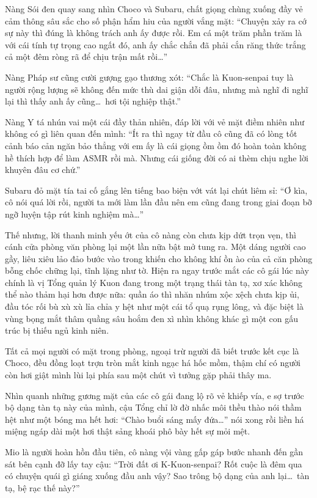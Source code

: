 \documentclass[../main.tex]{subfiles}
\begin{document}
Nàng Sói đen quay sang nhìn Choco và Subaru, chất giọng chùng xuống đầy vẻ cảm thông sâu sắc cho số phận hẩm hiu của người vắng mặt: ``Chuyện xảy ra cớ sự này thì đúng là không trách anh ấy được rồi. Em cá một trăm phần trăm là với cái tính tự trọng cao ngất đó, anh ấy chắc chắn đã phải cắn răng thức trắng cả một đêm ròng rã để chịu trận mất rồi\dots''

Nàng Pháp sư cũng cười gượng gạo thương xót: ``Chắc là Kuon-senpai tuy là người rộng lượng sẽ không đến mức thù dai giận dỗi đâu, nhưng mà nghĩ đi nghĩ lại thì thấy anh ấy cũng\dots\ hơi tội nghiệp thật.''

Nàng Y tá nhún vai một cái đầy thản nhiên, đáp lời với vẻ mặt điềm nhiên như không có gì liên quan đến mình: ``Ít ra thì ngay từ đầu cô cũng đã có lòng tốt cảnh báo cản ngăn bảo thẳng với em ấy là cái giọng ồm ồm đó hoàn toàn không hề thích hợp để làm ASMR rồi mà. Nhưng cái giống đời có ai thèm chịu nghe lời khuyên đâu cơ chứ.''

Subaru đỏ mặt tía tai cố gắng lên tiếng bao biện vớt vát lại chút liêm sỉ: ``Ơ kìa, cô nói quá lời rồi, người ta mới làm lần đầu nên em cũng đang trong giai đoạn bỡ ngỡ luyện tập rút kinh nghiệm mà\dots''

Thế nhưng, lời thanh minh yếu ớt của cô nàng còn chưa kịp dứt trọn vẹn, thì cánh cửa phòng văn phòng lại một lần nữa bật mở tung ra. Một dáng người cao gầy, liêu xiêu lảo đảo bước vào trong khiến cho không khí ồn ào của cả căn phòng bỗng chốc chững lại, tĩnh lặng như tờ. Hiện ra ngay trước mắt các cô gái lúc này chính là vị Tổng quản lý Kuon đang trong một trạng thái tàn tạ, xơ xác không thể nào thảm hại hơn được nữa: quần áo thì nhăn nhúm xộc xệch chưa kịp ủi, đầu tóc rối bù xù xù lỉa chỉa y hệt như một cái tổ quạ rụng lông, và đặc biệt là vùng bọng mắt thâm quầng sâu hoắm đen xì nhìn không khác gì một con gấu trúc bị thiếu ngủ kinh niên.

Tất cả mọi người có mặt trong phòng, ngoại trừ người đã biết trước kết cục là Choco, đều đồng loạt trợn tròn mắt kinh ngạc há hốc mồm, thậm chí có người còn hơi giật mình lùi lại phía sau một chút vì tưởng gặp phải thây ma.

Nhìn quanh những gương mặt của các cô gái đang lộ rõ vẻ khiếp vía, e sợ trước bộ dạng tàn tạ này của mình, cậu Tổng chỉ lờ đờ nhấc môi thều thào nói thầm hệt như một bóng ma hết hơi: ``Chào buổi sáng mấy đứa\dots'' nói xong rồi liền há miệng ngáp dài một hơi thật sảng khoái phô bày hết sự mỏi mệt.

Mio là người hoàn hồn đầu tiên, cô nàng vội vàng gấp gáp bước nhanh đến gần sát bên cạnh đỡ lấy tay cậu: ``Trời đất ơi K-Kuon-senpai? Rốt cuộc là đêm qua có chuyện quái gì giáng xuống đầu anh vậy? Sao trông bộ dạng của anh lại\dots\ tàn tạ, bệ rạc thế này?''
\end{document}
